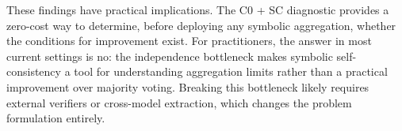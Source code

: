 \documentclass[11pt,a4paper]{article}
\begin{document}
These findings have practical implications. The C0 + SC diagnostic provides a zero-cost way to determine, before deploying any symbolic aggregation, whether the conditions for improvement exist. For practitioners, the answer in most current settings is no: the independence bottleneck makes symbolic self-consistency a tool for understanding aggregation limits rather than a practical improvement over majority voting. Breaking this bottleneck likely requires external verifiers or cross-model extraction, which changes the problem formulation entirely.


\begingroup
\renewcommand{\section}[2]{}
\end{document}

